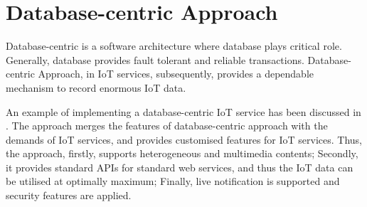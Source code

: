 \section{Database-centric Approach}
Database-centric is a software architecture where database plays critical role. Generally, database provides fault tolerant and reliable transactions. Database-centric Approach, in IoT services, subsequently, provides a dependable mechanism to record enormous IoT data. 

An example of implementing a database-centric IoT service has been discussed in \cite{francesco2012storage}. The approach merges the features of database-centric approach with the demands of IoT services, and provides customised features for IoT services. Thus, the approach, firstly, supports heterogeneous and multimedia contents; Secondly, it provides standard APIs for standard web services, and thus the IoT data can be utilised at optimally maximum; Finally, live notification is supported and security features are applied.



